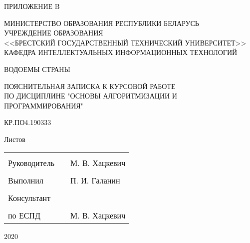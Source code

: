 \documentclass[12pt, a4paper]{article}
\begin{document}
\begin{titlepage}

    \begin{flushright}
        ПРИЛОЖЕНИЕ B
    \end{flushright}

    \vfill

    \begin{center}
        МИНИСТЕРСТВО ОБРАЗОВАНИЯ РЕСПУБЛИКИ БЕЛАРУСЬ\\
        УЧРЕЖДЕНИЕ ОБРАЗОВАНИЯ\\
        <<БРЕСТСКИЙ ГОСУДАРСТВЕННЫЙ ТЕХНИЧЕСКИЙ УНИВЕРСИТЕТ>>\\
        КАФЕДРА ИНТЕЛЛЕКТУАЛЬНЫХ ИНФОРМАЦИОННЫХ ТЕХНОЛОГИЙ\\
    \end{center}

    \vfill

    \begin{center}
        ВОДОЕМЫ СТРАНЫ
    \end{center}

    \vfill

    \begin{center}
        ПОЯСНИТЕЛЬНАЯ ЗАПИСКА К КУРСОВОЙ РАБОТЕ\\
        ПО ДИСЦИПЛИНЕ "ОСНОВЫ АЛГОРИТМИЗАЦИИ И ПРОГРАММИРОВАНИЯ"\\
    \end{center}

    \vfill

    \begin{center}
    КР.ПО4.190333
    \end{center}

    \vfill

    \begin{center}
    Листов \pageref{link:lastPage}
    \end{center}

    \vfill

    \begin{tabular}{ p{5cm} p{5cm} p{5cm}  }
        \multicolumn{3}{c}{}\\
        Руководитель & & М. В. Хацкевич\\
        &&\\
        Выполнил & & П. И. Галанин\\
        &&\\
        Консультант & & \\
        &&\\
        по ЕСПД & & М. В. Хацкевич\\
    \end{tabular}
        
    \vfill

    \begin{center}
        2020
    \end{center}
\end{titlepage}
\newpage
\end{document}
